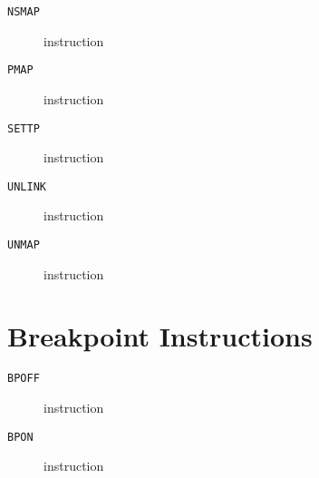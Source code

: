 \clearpage
\begin{description}
\item[\texttt{NSMAP}] instruction\\

\end{description}
\clearpage
\begin{description}
\item[\texttt{PMAP}] instruction\\

\end{description}
\clearpage
\begin{description}
\item[\texttt{SETTP}] instruction\\

\end{description}
\clearpage
\begin{description}
\item[\texttt{UNLINK}] instruction\\

\end{description}
\clearpage
\begin{description}
\item[\texttt{UNMAP}] instruction\\

\end{description}
\clearpage
\section{Breakpoint Instructions}
\begin{description}
\item[\texttt{BPOFF}] instruction\\

\end{description}
\clearpage
\begin{description}
\item[\texttt{BPON}] instruction\\

\end{description}
\clearpage
